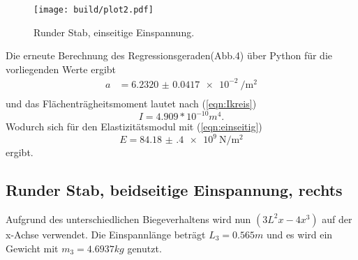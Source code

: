 \begin{figure}[h]
  \centering
  \texttt{[image: build/plot2.pdf]}
  \caption{Runder Stab, einseitige Einspannung.}
  \label{fig:plot2}
\end{figure}

Die erneute Berechnung des Regressionsgeraden(Abb.4) über Python
für die vorliegenden Werte ergibt
\begin{align*}
  a &= \SI{6.2320(417)e-2}{\per\square\meter} \\
\end{align*}
und das Flächenträgheitsmoment lautet nach (\ref{eqn:Ikreis})
\begin{equation}
  I = 4.909* 10^{-10} m^4.
  \label{const:Ikreis}
\end{equation}
\newline
Wodurch sich für den Elastizitätsmodul mit (\ref{eqn:einseitig})
\begin{equation*}
  E = \SI{84.18(40)e9}{\newton\per\square\meter}
\end{equation*}
ergibt.
\newpage
\subsection{Runder Stab, beidseitige Einspannung, rechts}
Aufgrund des unterschiedlichen Biegeverhaltens wird nun $(3L^2x-4x^3)$
auf der x-Achse verwendet. Die Einspannlänge beträgt $L_3 = 0.565m$
und es wird ein Gewicht mit $m_3 = 4.6937 kg$ genutzt.

